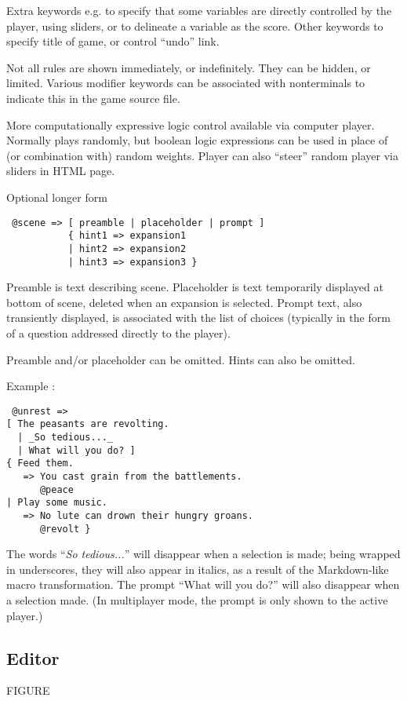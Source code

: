 \documentclass{acm_proc_article-sp}
\begin{document}
Extra keywords e.g. to specify that some variables are directly controlled by the player, using sliders,
or to delineate a variable as the score.
Other keywords to specify title of game, or control ``undo'' link.

Not all rules are shown immediately, or indefinitely.
They can be hidden, or limited.
Various modifier keywords can be associated with nonterminals to indicate this in the game source file.

More computationally expressive logic control available via computer player.
Normally plays randomly, but boolean logic expressions can be used in place of (or combination with) random weights.
Player can also ``steer'' random player via sliders in HTML page.

Optional longer form
\begin{verbatim}
 @scene => [ preamble | placeholder | prompt ]
           { hint1 => expansion1
           | hint2 => expansion2
           | hint3 => expansion3 }
\end{verbatim}

Preamble is text describing scene.
Placeholder is text temporarily displayed at bottom of scene, deleted when an expansion is selected.
Prompt text, also transiently displayed, is associated with the list of choices (typically in the form of a question addressed directly to the player).

Preamble and/or placeholder can be omitted.
Hints can also be omitted.

Example \cite{ChoiceOfGamesBlog}:
\begin{verbatim}
 @unrest =>
[ The peasants are revolting. 
  | _So tedious..._ 
  | What will you do? ] 
{ Feed them.
   => You cast grain from the battlements.
      @peace
| Play some music.
   => No lute can drown their hungry groans.
      @revolt }
\end{verbatim}

The words ``{\em So tedious...}'' will disappear when a selection is made; being wrapped in underscores, they will also appear in italics, as a result of the Markdown-like macro transformation.
The prompt ``What will you do?'' will also disappear when a selection made.
(In multiplayer mode, the prompt is only shown to the active player.)


\subsection{Editor}

FIGURE
\end{document}

